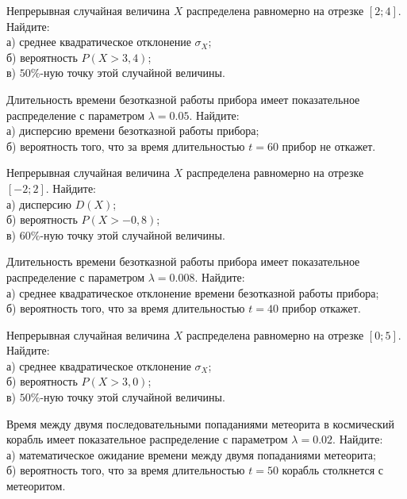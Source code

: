\vfill

\newpage\setcounter{zad}{0}

\z Непрерывная случайная величина $X$ распределена равномерно на отрезке $[2; 4]$. Найдите: \\ \quad а) среднее квадратическое отклонение $\sigma_X$; \\ \quad б) вероятность $P(X>3{,}4)$; \\ \quad в) $50\%$-ную точку этой случайной величины.


\vfill

\z Длительность времени безотказной работы прибора имеет показательное распределение с параметром $\lambda = 0.05$. Найдите: \\ \quad а) дисперсию времени безотказной работы прибора; \\ \quad б) вероятность того, что за время длительностью $t = 60$ прибор не откажет.
 

\vfill

\newpage\setcounter{zad}{0}

\z Непрерывная случайная величина $X$ распределена равномерно на отрезке $[-2; 2]$. Найдите: \\ \quad а) дисперсию $D(X)$; \\ \quad б) вероятность $P(X>-0{,}8)$; \\ \quad в) $60\%$-ную точку этой случайной величины.


\vfill

\z Длительность времени безотказной работы прибора имеет показательное распределение с параметром $\lambda = 0.008$. Найдите: \\ \quad а) среднее квадратическое отклонение времени безотказной работы прибора; \\ \quad б) вероятность того, что за время длительностью $t = 40$ прибор  откажет.
 

\vfill

\newpage\setcounter{zad}{0}

\z Непрерывная случайная величина $X$ распределена равномерно на отрезке $[0; 5]$. Найдите: \\ \quad а) среднее квадратическое отклонение $\sigma_X$; \\ \quad б) вероятность $P(X>3{,}0)$; \\ \quad в) $50\%$-ную точку этой случайной величины.


\vfill

\z Время между двумя последовательными попаданиями метеорита в космический корабль имеет показательное распределение с параметром $\lambda = 0.02$. Найдите: \\ \quad а) математическое ожидание времени между двумя попаданиями метеорита; \\ \quad б) вероятность того, что за время длительностью $t = 50$ корабль  столкнется с метеоритом.
 

